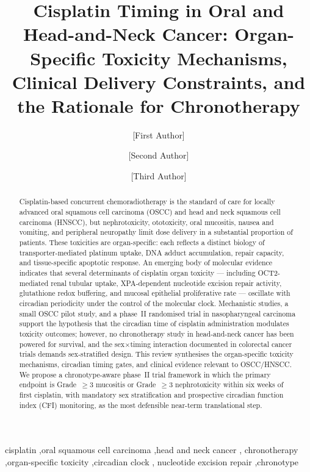 \documentclass[preprint,review,12pt]{elsarticle}
\begin{document}
\begin{frontmatter}

\title{Cisplatin Timing in Oral and Head-and-Neck Cancer: Organ-Specific
  Toxicity Mechanisms, Clinical Delivery Constraints, and the Rationale
  for Chronotherapy}

\author[1,2]{[First Author]}
\author[1]{[Second Author]}
\author[2]{[Third Author]}


\address[1]{Department of Oral and Maxillofacial Surgery / Oncology,
  [Institution], [City, Country]}
\address[2]{Department of Radiation Oncology, [Institution], [City, Country]}

\begin{abstract}
Cisplatin-based concurrent chemoradiotherapy is the standard of care for
locally advanced oral squamous cell carcinoma (OSCC) and head and neck
squamous cell carcinoma (HNSCC), but nephrotoxicity, ototoxicity, oral
mucositis, nausea and vomiting, and peripheral neuropathy limit dose
delivery in a substantial proportion of patients.  These toxicities are
organ-specific: each reflects a distinct biology of transporter-mediated
platinum uptake, DNA adduct accumulation, repair capacity, and
tissue-specific apoptotic response.  An emerging body of molecular evidence
indicates that several determinants of cisplatin organ toxicity --- including
OCT2-mediated renal tubular uptake, XPA-dependent nucleotide excision
repair activity, glutathione redox buffering, and mucosal epithelial
proliferative rate --- oscillate with circadian periodicity under the control
of the molecular clock.  Mechanistic studies, a small OSCC pilot study, and
a phase~II randomised trial in nasopharyngeal carcinoma support the hypothesis
that the circadian time of cisplatin administration modulates toxicity
outcomes; however, no chronotherapy study in head-and-neck cancer has been
powered for survival, and the sex$\times$timing interaction documented in
colorectal cancer trials demands sex-stratified design.  This review synthesises the organ-specific toxicity mechanisms, circadian
timing gates, and clinical evidence relevant to OSCC/HNSCC.  We propose
a chronotype-aware phase~II trial framework in which the primary endpoint
is Grade~$\geq$3 mucositis or Grade~$\geq$3 nephrotoxicity within six
weeks of first cisplatin, with mandatory sex stratification and prospective
circadian function index (CFI) monitoring, as the most defensible near-term
translational step.
\end{abstract}

\begin{keyword}
cisplatin \sep oral squamous cell carcinoma \sep head and neck cancer \sep
chronotherapy \sep organ-specific toxicity \sep circadian clock \sep
nucleotide excision repair \sep chronotype
\end{keyword}

\end{frontmatter}
\end{document}
